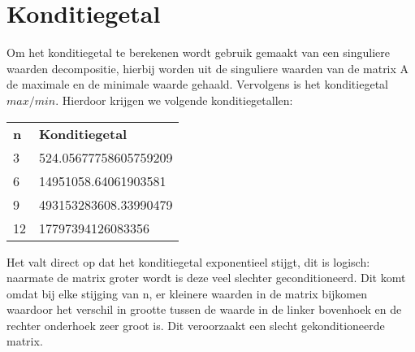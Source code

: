\documentclass[10pt,a4paper]{article}
\begin{document}
\section{Konditiegetal}
Om het konditiegetal te berekenen wordt gebruik gemaakt van een singuliere waarden decompositie, hierbij worden uit de singuliere waarden van de matrix A de maximale en de minimale waarde gehaald. Vervolgens is het konditiegetal $max/min$. Hierdoor krijgen we volgende konditiegetallen:
\begin{center}
\begin{tabular}{ll}
\textbf{n} & \textbf{Konditiegetal} \\
3          & 524.05677758605759209            \\
6          & 14951058.64061903581            \\
9          & 493153283608.33990479             \\
12         & 17797394126083356           
\end{tabular}
\end{center}
Het valt direct op dat het konditiegetal exponentieel stijgt, dit is logisch: naarmate de matrix groter wordt is deze veel slechter geconditioneerd. Dit komt omdat bij elke stijging van n, er kleinere waarden in de matrix bijkomen waardoor het verschil in grootte tussen de waarde in de linker bovenhoek en de rechter onderhoek zeer groot is. Dit veroorzaakt een slecht gekonditioneerde matrix.
\end{document}
